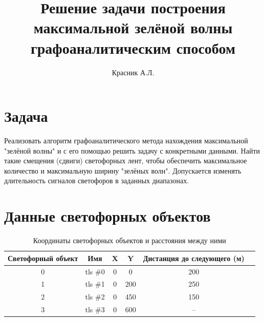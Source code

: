 \documentclass[12pt]{article}
\title{Решение задачи построения максимальной зелёной волны графоаналитическим способом}
\author{Красник А.Л.}
\begin{document}
\maketitle
\newpage
\section{Задача}
Реализовать алгоритм графоаналитического метода нахождения максимальной "зелёной волны" и с его помощью решить задачу с конкретными данными. Найти такие смещения (сдвиги) светофорных лент, чтобы обеспечить максимальное количество и максимальную ширину "зелёных волн". Допускается изменять длительность сигналов светофоров в заданных диапазонах.
\section{Данные светофорных объектов}
\begin{table}[h!]
\centering
\caption{Координаты светофорных объектов и расстояния между ними}
\begin{tabular}{cccccc}
\toprule
Светофорный объект & Имя & X & Y & Дистанция до следующего (м) \\
\midrule
0 & tls \#0 & 0   & 0   & 200 \\
1 & tls \#1 & 0   & 200 & 250 \\
2 & tls \#2 & 0   & 450 & 150 \\
3 & tls \#3 & 0   & 600 & --  \\
\bottomrule
\end{tabular}
\end{table}
\end{document}
